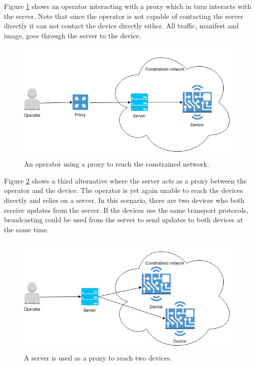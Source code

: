 \documentclass[0-thesis.tex]{subfiles}
\begin{document}
Figure \ref{fig:operator-proxy} shows an operator interacting with a proxy which in turn
interacts with the server. Note that since the operator is not capable of contacting the
server directly it can not contact the device directly either. All traffic, manifest and
image, goes through the server to the device. 

\begin{figure}
    \caption{An operator using a proxy to reach the constrained network.}
    \label{fig:operator-proxy}
    \includegraphics[scale=0.7]{images/operator-proxy.png}
\end{figure}

Figure \ref{fig:operator-server} shows a third alternative where the server acts as a
proxy between the operator and the device. The operator is yet again unable to reach the
devices directly and relies on a server. In this scenario, there are two devices who both
receive updates from the server. If the devices use the same transport protocols,
broadcasting could be used from the server to send updates to both devices at the same
time.

\begin{figure}
    \caption{A server is used as a proxy to reach two devices.}
    \label{fig:operator-server}
    \includegraphics[scale=0.8]{images/operator-server.png}
\end{figure}
\end{document}
